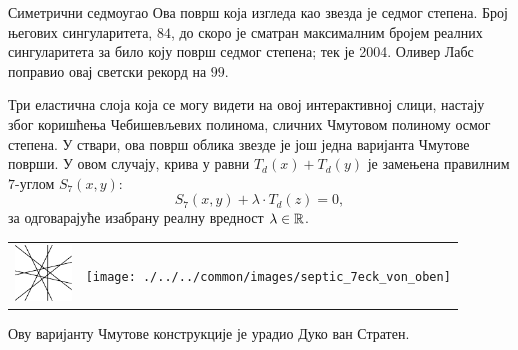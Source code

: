 \begin{surferPage}{Симетрични седмоугао}
    Ова површ која изгледа као звезда је седмог степена. Број његових сингуларитета, $84$, 
	до скоро је сматран максималним бројем реалних сингуларитета за било коју површ седмог степена;
    тек је 2004. Оливер Лабс поправио овај светски рекорд на $99$.
  
  
 Три еластична слоја која се могу видети на овој интерактивној слици, 
    настају због коришћења Чебишевљевих полинома, сличних Чмутовом 
    полиному осмог степена. 
    У ствари, ова површ облика звезде је још једна варијанта Чмутове површи.
    У овом случају, крива у равни $T_d(x)+T_d(y)$ је замењена правилним $7$-углом
    $S_7(x,y)$: 
   \[S_7(x,y) + \lambda \cdot T_d(z) = 0,\]
    за одговарајуће изабрану реалну вредност $\lambda\in{\mathbb R}$. 
    \vspace*{-0.3em}
    \begin{center}
      \begin{tabular}{c@{\qquad}c}
        \includegraphics[height=1.5cm]{./../../common/images/labsseptic1.pdf}
        &
        \texttt{[image: ./../../common/images/septic\_7eck\_von\_oben]}
      \end{tabular}
    \end{center}
    \vspace*{-0.3em}   
   Ову варијанту Чмутове конструкције је урадио Дуко ван Стратен.
\end{surferPage}
